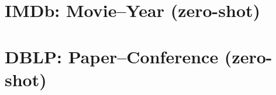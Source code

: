 \documentclass[11pt,a4paper]{article}
\begin{document}
\section*{IMDb: Movie--Year (zero-shot)}

\FloatBarrier

\FloatBarrier

\clearpage
\section*{DBLP: Paper--Conference (zero-shot)}

\FloatBarrier

\FloatBarrier
\end{document}
